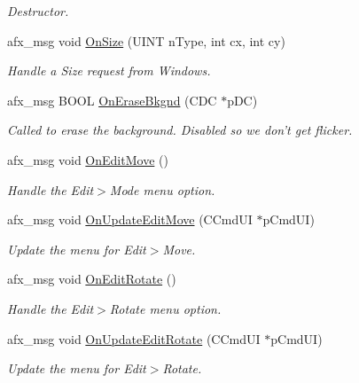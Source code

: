 \begin{DoxyCompactItemize}
\begin{DoxyCompactList}\small\item\em Destructor. \end{DoxyCompactList}\item 
afx\+\_\+msg void \hyperlink{class_c_main_frame_adf171bf1f2c6f10cc85dbe8db3fc93f7}{On\+Size} (U\+I\+N\+T n\+Type, int cx, int cy)
\begin{DoxyCompactList}\small\item\em Handle a Size request from Windows. \end{DoxyCompactList}\item 
afx\+\_\+msg B\+O\+O\+L \hyperlink{class_c_main_frame_a53a97f2229c5765329b2b59a21a54b0d}{On\+Erase\+Bkgnd} (C\+D\+C $\ast$p\+D\+C)
\begin{DoxyCompactList}\small\item\em Called to erase the background. Disabled so we don't get flicker. \end{DoxyCompactList}\item 
\hypertarget{class_c_main_frame_af07c2610f9f5631e7eb7374d10d5fdd3}{afx\+\_\+msg void \hyperlink{class_c_main_frame_af07c2610f9f5631e7eb7374d10d5fdd3}{On\+Edit\+Move} ()}\label{class_c_main_frame_af07c2610f9f5631e7eb7374d10d5fdd3}

\begin{DoxyCompactList}\small\item\em Handle the Edit$>$Mode menu option. \end{DoxyCompactList}\item 
afx\+\_\+msg void \hyperlink{class_c_main_frame_aadc40c4ab290da2368f6b87443f5ffbc}{On\+Update\+Edit\+Move} (C\+Cmd\+U\+I $\ast$p\+Cmd\+U\+I)
\begin{DoxyCompactList}\small\item\em Update the menu for Edit$>$Move. \end{DoxyCompactList}\item 
\hypertarget{class_c_main_frame_a00f10667f35de1fa6693c1bea941d878}{afx\+\_\+msg void \hyperlink{class_c_main_frame_a00f10667f35de1fa6693c1bea941d878}{On\+Edit\+Rotate} ()}\label{class_c_main_frame_a00f10667f35de1fa6693c1bea941d878}

\begin{DoxyCompactList}\small\item\em Handle the Edit$>$Rotate menu option. \end{DoxyCompactList}\item 
afx\+\_\+msg void \hyperlink{class_c_main_frame_af098b8129775d1b5fb47fcaaabce8c01}{On\+Update\+Edit\+Rotate} (C\+Cmd\+U\+I $\ast$p\+Cmd\+U\+I)
\begin{DoxyCompactList}\small\item\em Update the menu for Edit$>$Rotate. \end{DoxyCompactList}\end{DoxyCompactItemize}
